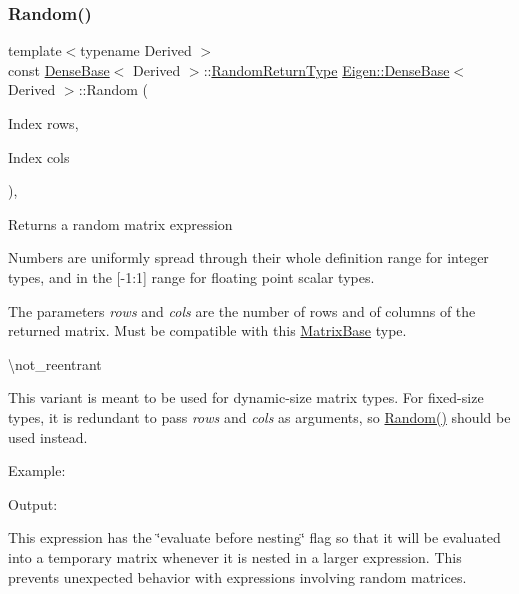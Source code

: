 \subsubsection{\texorpdfstring{Random()}{Random()}\hspace{0.1cm}{\footnotesize\ttfamily [1/3]}}
{\footnotesize\ttfamily template$<$typename Derived $>$ \\
const \mbox{\hyperlink{class_eigen_1_1_dense_base}{Dense\+Base}}$<$ Derived $>$\+::\mbox{\hyperlink{class_eigen_1_1_cwise_nullary_op}{Random\+Return\+Type}} \mbox{\hyperlink{class_eigen_1_1_dense_base}{Eigen\+::\+Dense\+Base}}$<$ Derived $>$\+::Random (\begin{DoxyParamCaption}\item[{Index}]{rows,  }\item[{Index}]{cols }\end{DoxyParamCaption})\hspace{0.3cm}{\ttfamily [inline]}, {\ttfamily [static]}}

\begin{DoxyReturn}{Returns}
a random matrix expression
\end{DoxyReturn}
Numbers are uniformly spread through their whole definition range for integer types, and in the \mbox{[}-\/1\+:1\mbox{]} range for floating point scalar types.

The parameters {\itshape rows} and {\itshape cols} are the number of rows and of columns of the returned matrix. Must be compatible with this \mbox{\hyperlink{class_eigen_1_1_matrix_base}{Matrix\+Base}} type.

\textbackslash{}not\+\_\+reentrant

This variant is meant to be used for dynamic-\/size matrix types. For fixed-\/size types, it is redundant to pass {\itshape rows} and {\itshape cols} as arguments, so \mbox{\hyperlink{class_eigen_1_1_dense_base_ae814abb451b48ed872819192dc188c19}{Random()}} should be used instead.

Example\+: 
\begin{DoxyCodeInclude}{0}
\end{DoxyCodeInclude}
 Output\+: 
\begin{DoxyVerbInclude}
\end{DoxyVerbInclude}


This expression has the \char`\"{}evaluate before nesting\char`\"{} flag so that it will be evaluated into a temporary matrix whenever it is nested in a larger expression. This prevents unexpected behavior with expressions involving random matrices.

